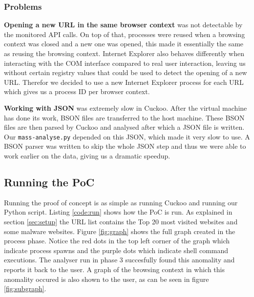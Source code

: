 \subsubsection{Problems}
\label{99problems}

\textbf{Opening a new URL in the same browser context} was not detectable by the monitored API calls. On top of that, processes were reused when a browsing context was closed and a new one was opened, this made it essentially the same as reusing the browsing context. Internet Explorer also behaves differently when interacting with the COM interface compared to real user interaction, leaving us without certain registry values that could be used to detect the opening of a new URL. Therefor we decided to use a new Internet Explorer process for each URL which gives us a process ID per browser context.

\textbf{Working with JSON} was extremely slow in Cuckoo. After the virtual machine has done its work, BSON files are transferred to the host machine. These BSON files are then parsed by Cuckoo and analysed after which a JSON file is written. Our \texttt{mass-analyse.py} depended on this JSON, which made it very slow to use. A BSON parser was written to skip the whole JSON step and thus we were able to work earlier on the data, giving us a dramatic speedup.

\subsection{Running the PoC}

Running the proof of concept is as simple as running Cuckoo and running our Python script. Listing \ref{code:run} shows how the PoC is run. As explained in section \ref{sec:setup} the URL list contains the Top 20 most visited websites and some malware websites. Figure \ref{fig:graph} shows the full graph created in the process phase. Notice the red dots in the top left corner of the graph which indicate process spawns and the purple dots which indicate shell command executions. The analyser run in phase 3 succesfully found this anomality and reports it back to the user. A graph of the browsing context in which this anomality occured is also shown to the user, as can be seen in figure \ref{fig:subgraph}.

